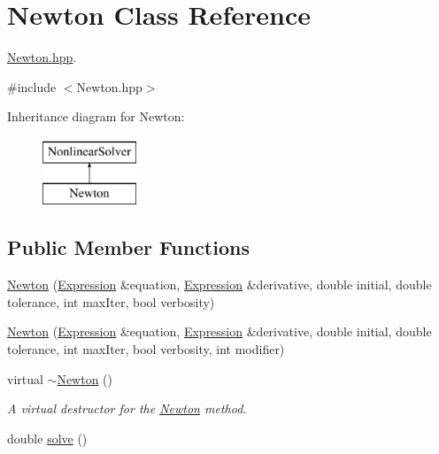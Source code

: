 \hypertarget{class_newton}{}\section{Newton Class Reference}
\label{class_newton}


\hyperlink{_newton_8hpp_source}{Newton.\+hpp}.  




{\ttfamily \#include $<$Newton.\+hpp$>$}

Inheritance diagram for Newton\+:\begin{figure}[H]
\begin{center}
\leavevmode
\includegraphics[height=2.000000cm]{class_newton}
\end{center}
\end{figure}
\subsection*{Public Member Functions}
\begin{DoxyCompactItemize}
\item 
\hyperlink{class_newton_ac64453229e5ac9ceee846bbefbb3d3e2}{Newton} (\hyperlink{class_expression}{Expression} \&equation, \hyperlink{class_expression}{Expression} \&derivative, double initial, double tolerance, int max\+Iter, bool verbosity)
\item 
\hyperlink{class_newton_a076a4ed0ada157318fda266cbdc78b08}{Newton} (\hyperlink{class_expression}{Expression} \&equation, \hyperlink{class_expression}{Expression} \&derivative, double initial, double tolerance, int max\+Iter, bool verbosity, int modifier)
\item 
virtual \hyperlink{class_newton_a12782031a0e3dc0806ee5e4774d8ab35}{$\sim$\+Newton} ()\hypertarget{class_newton_a12782031a0e3dc0806ee5e4774d8ab35}{}\label{class_newton_a12782031a0e3dc0806ee5e4774d8ab35}

\begin{DoxyCompactList}\small\item\em A virtual destructor for the \hyperlink{class_newton}{Newton} method. \end{DoxyCompactList}\item 
double \hyperlink{class_newton_a09981094747d53116cf7a4a5194d8787}{solve} ()
\end{DoxyCompactItemize}

